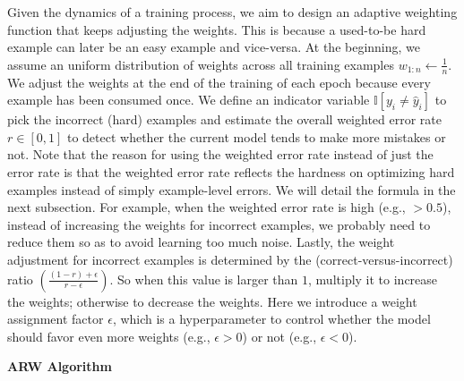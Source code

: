 Given the dynamics of a training process, we aim to design an adaptive weighting function that keeps adjusting the weights.
This is because a used-to-be hard example can later be an easy example and vice-versa.
At the beginning, we assume an uniform distribution of weights across all training examples $w_{1:n} \gets \frac{1}{n} $.
We adjust the weights at the end of the training of each epoch because every example has been consumed once.
We define an indicator variable $\mathbb{I}[y_{i} \neq \hat{y}_{i}]$ to pick the incorrect (hard) examples and estimate the overall weighted error rate $r \in [0, 1]$ to detect whether the current model tends to make more mistakes or not. 
Note that the reason for using the weighted error rate instead of just the error rate is that the weighted error rate reflects the hardness on optimizing hard examples instead of simply example-level errors. We will detail the formula in the next subsection.
For example, when the weighted error rate is high (e.g., $>0.5$), instead of increasing the weights for incorrect examples, we probably need to reduce them so as to avoid learning too much noise.
Lastly, the weight adjustment for incorrect examples is determined by the (correct-versus-incorrect) ratio $(\frac{(1-r)+\epsilon}{r-\epsilon})$. So when this value is larger than $1$, multiply it to increase the weights; otherwise to decrease the weights.
Here we introduce a weight assignment factor $\epsilon$, which is a hyperparameter to control whether the model should favor even more weights (e.g., $\epsilon>0$) or not (e.g., $\epsilon<0$).

\textbf{ARW Algorithm}

